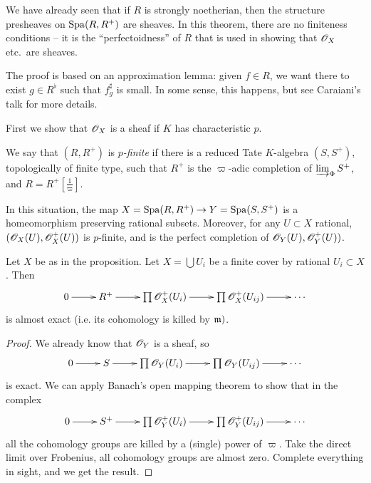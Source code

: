 We have already seen that if $R$ is strongly noetherian, then the structure 
presheaves on $\operatorname{Spa}(R,R^+)$ are sheaves. In this theorem, there are no finiteness 
conditions -- it is the ``perfectoidness'' of $R$ that is used in showing that 
$\mathscr{O}_X$ etc.\ are sheaves. 

The proof is based on an approximation lemma: given $f\in R$, we want there to 
exist $g\in R^\flat$ such that $f_g^\sharp$ is small. In some sense, this happens, 
but see Caraiani's talk for more details. 

First we show that $\mathscr{O}_X$ is a sheaf if $K$ has characteristic $p$. 

\begin{definition}
We say 
that $(R,R^+)$ is \emph{$p$-finite} if there is a reduced Tate $K$-algebra 
$(S,S^+)$, topologically of finite type, such that $R^+$ is the $\varpi$-adic 
completion of $\varinjlim_\Phi S^+$, and $R=R^+[\frac 1 \varpi]$. 
\end{definition}

\begin{proposition}
In this situation, the map $X=\operatorname{Spa}(R,R^+) \to Y=\operatorname{Spa}(S,S^+)$ is a 
homeomorphism preserving rational subsets. Moreover, for any $U\subset X$ rational, 
$(\mathscr{O}_X(U),\mathscr{O}_X^+(U))$ is $p$-finite, and is the perfect completion of 
$\mathscr{O}_Y(U),\mathscr{O}_Y^+(U))$. 
\end{proposition}


\begin{corollary}
Let $X$ be as in the proposition. Let $X=\bigcup U_i$ be a finite cover by 
rational $U_i\subset X$. Then 
\[\xymatrix{
  0 \ar[r] 
    & R^+ \ar[r] 
    & \prod \sO_X^+(U_i) \ar[r] 
    & \prod \sO_X^+(U_{i j}) \ar[r] 
    & \cdots 
}\]
is almost exact (i.e. its cohomology is killed by $\mathfrak{m})$. 
\end{corollary}
\begin{proof}
We already know that $\mathscr{O}_Y$ is a sheaf, so 
\[\xymatrix{
  0 \ar[r] 
    & S \ar[r] 
    & \prod \sO_Y(U_i) \ar[r] 
    & \prod \sO_Y(U_{i j}) \ar[r] 
    & \cdots
}\]
is exact. We can apply Banach's open mapping theorem to show that in the complex 
\[\xymatrix{
  0 \ar[r] 
    & S^+ \ar[r] 
    & \prod \sO_Y^+(U_i) \ar[r] 
    & \prod \sO_Y^+(U_{i j}) \ar[r] 
    & \cdots 
}\]
all the cohomology groups are killed by a (single) power of $\varpi$. Take the 
direct limit over Frobenius, all cohomology groups are almost zero. Complete 
everything in sight, and we get the result. 
\end{proof}

